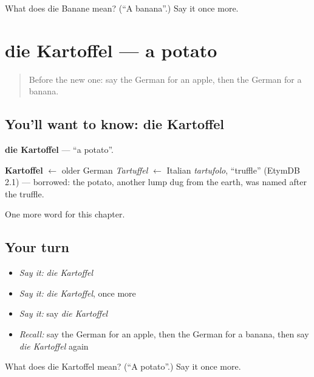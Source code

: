 \begin{tcolorbox}[breakable,colback=teal!4,colframe=teal!35!black,title={Before you move on}]
What does die Banane mean? (\textquotedblleft{}A banana\textquotedblright{}.) Say it once more.
\end{tcolorbox}
\section[die Kartoffel]{die Kartoffel — a potato}

\label{lesson:GE-C70-kartoffel}



\begin{quote}
Before the new one: say the German for an apple, then the German for a banana.
\end{quote}

\subsection*{You'll want to know: die Kartoffel}
\textbf{die Kartoffel} — \textquotedblleft{}a potato\textquotedblright{}.

\begin{cousinweb}
\textbf{Kartoffel} $\leftarrow$ older German \emph{Tartuffel} $\leftarrow$ Italian \emph{tartufolo}, \textquotedblleft{}truffle\textquotedblright{} (EtymDB 2.1) — borrowed: the potato, another lump dug from the earth, was named after the truffle.
\end{cousinweb}

\begin{grammarlens}[title={What you've built}]
One more word for this chapter.
\end{grammarlens}

\subsection*{Your turn}
\begin{itemize}
\raggedright
  \item \emph{Say it:} \emph{die Kartoffel}
  \item \emph{Say it:} \emph{die Kartoffel}, once more
  \item \emph{Say it:} say \emph{die Kartoffel}
  \item \emph{Recall:} say the German for an apple, then the German for a banana, then say \emph{die Kartoffel} again
\end{itemize}

\begin{tcolorbox}[breakable,colback=teal!4,colframe=teal!35!black,title={Before you move on}]
What does die Kartoffel mean? (\textquotedblleft{}A potato\textquotedblright{}.) Say it once more.
\end{tcolorbox}
